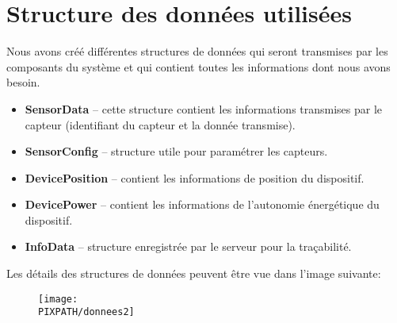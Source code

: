 \section{Structure des données utilisées} 

Nous avons créé différentes structures de données qui seront transmises par les 
composants du système et qui contient toutes les informations dont nous avons 
besoin. \\

\begin{itemize}
\item \textbf{SensorData} – cette structure contient les informations transmises 
par le capteur (identifiant du capteur et la donnée transmise).
\item \textbf{SensorConfig} –  structure utile pour paramétrer les capteurs.
\item \textbf{DevicePosition} – contient les informations de position du dispositif.
\item \textbf{DevicePower} – contient les informations de l’autonomie énergétique 
du dispositif.
\item \textbf{InfoData} – structure enregistrée par le serveur pour la traçabilité.
\end{itemize}

Les détails des structures de données peuvent être vue dans l'image suivante:

    \begin{figure}
    \centering
    \texttt{[image: \\PIXPATH/donnees2]}
    \end{figure}
